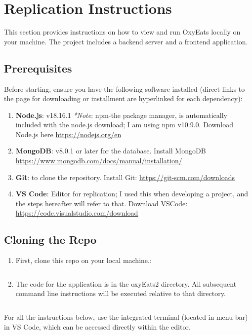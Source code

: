 \documentclass[10pt,twocolumn]{article}
\begin{document}
\section{Replication Instructions}
This section provides instructions on how to view and run OxyEats locally on your machine. The project includes a backend server and a frontend application.

\subsection{Prerequisites}
Before starting, ensure you have the following software installed (direct links to the page for downloading or installment are hyperlinked for each dependency):
\begin{enumerate}
    \item \textbf{Node.js}: v18.16.1 \textit{*Note}: npm-the package manager, is automatically included with the node.js download; I am using npm v10.9.0. Download Node.js here \url{https://nodejs.org/en} 
    \item \textbf{MongoDB}: v8.0.1 or later for the database. Install MongoDB \url{https://www.mongodb.com/docs/manual/installation/} 
    \item \textbf{Git}: to clone the repository. Install Git: \url{https://git-scm.com/downloads}
    \item \textbf{VS Code}: Editor for replication; I used this when developing a project, and the steps hereafter will refer to that. Download VSCode: \url{https://code.visualstudio.com/download}
\end{enumerate}
\subsection{Cloning the Repo}
\begin{enumerate}
    \item First, clone this repo on your local machine.:
\begin{lstlisting}[language=bash]
  % git clone https://github.com/mcgrath-a/oxyEats2.git
\end{lstlisting}
\item The code for the application is in the oxyEats2 directory. All subsequent command line instructions will be executed relative to that directory.
\begin{lstlisting}[language=bash]
  % cd oxyEats2
\end{lstlisting}
\end{enumerate}
For all the instructions below, use the integrated terminal (located in menu bar) in VS Code, which can be accessed directly within the editor.
\end{document}
